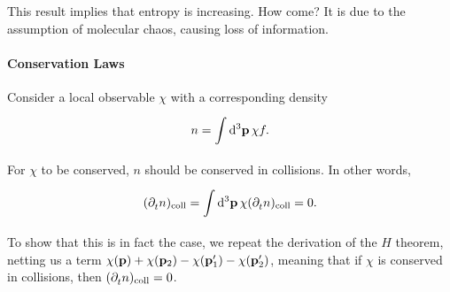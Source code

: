 This result implies that entropy is increasing. How come? It is due to the assumption of molecular chaos, causing loss of information.

\paragraph{Conservation Laws}
Consider a local observable $\chi$ with a corresponding density
\begin{align*}
	n = \int\limits_{}^{}\dd[3]{\vb{p}}\chi f.
\end{align*}
For $\chi$ to be conserved, $n$ should be conserved in collisions. In other words,
\begin{align*}
	(\partial^{}_{t}n)_{\text{coll}} = \int\limits_{}^{}\dd[3]{\vb{p}}\chi (\partial^{}_{t}n)_{\text{coll}} = 0.
\end{align*}
To show that this is in fact the case, we repeat the derivation of the $H$ theorem, netting us a term $\chi(\vb{p}) + \chi(\vb{p}_{2}) - \chi(\vb{p}_{1}^{\prime}) - \chi(\vb{p}_{2}^{\prime})$, meaning that if $\chi$ is conserved in collisions, then $(\partial^{}_{t}n)_{\text{coll}} = 0$.
